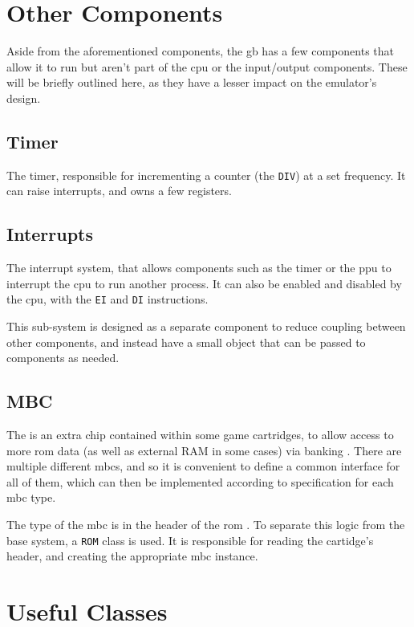 \documentclass[11pt]{report}
\begin{document}
\section{Other Components}

Aside from the aforementioned components, the \gls{gb} has a few components that allow it to run but aren't part of the \gls{cpu} or the input/output components. These will be briefly outlined here, as they have a lesser impact on the emulator's design.

\subsection{Timer}

The timer, responsible for incrementing a counter (the \texttt{DIV}) at a set frequency. It can raise interrupts, and owns a few registers.

\subsection{Interrupts}

The interrupt system, that allows components such as the timer or the \gls{ppu} to interrupt the \gls{cpu} to run another process. It can also be enabled and disabled by the \gls{cpu}, with the \texttt{EI} and \texttt{DI} instructions.

This sub-system is designed as a separate component to reduce coupling between other components, and instead have a small object that can be passed to components as needed.

\subsection{MBC}

The  is an extra chip contained within some game cartridges, to allow access to more \gls{rom} data (as well as external RAM in some cases) via banking \cite[MBCs]{pandoc}. There are multiple different \glspl{mbc}, and so it is convenient to define a common interface for all of them, which can then be implemented according to specification for each \gls{mbc} type.

The type of the \gls{mbc} is in the header of the \gls{rom} \cite[The Cartridge Header]{pandoc}. To separate this logic from the base system, a \texttt{ROM} class is used. It is responsible for reading the cartidge's header, and creating the appropriate \gls{mbc} instance.

\section{Useful Classes}
\end{document}
